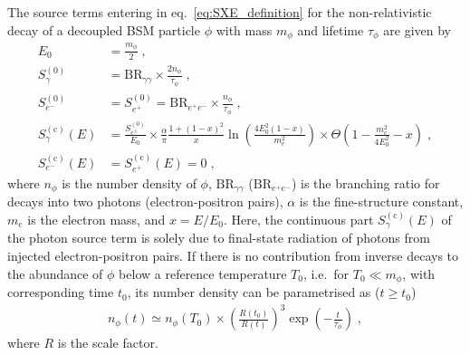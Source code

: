 \documentclass[11pt,a4paper]{article}
\newcommand{\eqsp}{\;}
\begin{document}
The source terms entering in eq.~\eqref{eq:SXE_definition} for the non-relativistic decay of a decoupled BSM particle $\phi$ with mass $m_\phi$ and lifetime $\tau_\phi$ are given by~\cite{Hufnagel:2018bjp,Forestell:2018txr,Mardon:2009rc,Birkedal:2005ep}
\begin{align}
E_0 &= \frac{m_\phi}{2}\eqsp, \\
S_\gamma^{(0)} &= \text{BR}_{\gamma \gamma} \times \frac{2 n_\phi}{\tau_\phi}\eqsp,\label{eq:sa_decay} \\
S_{e^-}^{(0)} &= S_{e^+}^{(0)} = \text{BR}_{e^+ e^-} \times \frac{n_\phi}{\tau_\phi}\eqsp,\label{eq:se_decay} \\
S_\gamma^{(\text{c})} (E) &= \frac{S^{(0)}_{e^\pm}}{E_0} \times \frac{\alpha}{\pi} \frac{1 + (1-x)^2}{x} \ln \left( \frac{4 E_0^2 (1-x)}{m_e^2} \right) \times \Theta \left( 1 - \frac{m_e^2}{4 E_0^2} - x \right)\eqsp, \label{eq:safsr_decay}\\
S_{e^-}^{(\text{c})} (E) &= S_{e^+}^{(\text{c})} (E) = 0\eqsp,
\end{align}
where $n_\phi$ is the number density of $\phi$, $\text{BR}_{\gamma \gamma}$ ($\text{BR}_{e^+ e^-}$) is the branching ratio for decays into two photons (electron-positron pairs), $\alpha$ is the fine-structure constant, $m_e$ is the electron mass, and $x = E/E_0$. Here, the continuous part $S_\gamma^{(\text{c})} (E)$ of the photon source term is solely due to final-state radiation of photons from injected electron-positron pairs.  If there is no contribution from inverse decays to the abundance of $\phi$ below a reference temperature $T_0$, i.e.\ for $T_0 \ll m_\phi$, with corresponding time $t_0$, its number density can be parametrised as ($t \geq t_0$)
\begin{align}
n_\phi (t) \simeq n_\phi (T_0) \times \left( \frac{R(t_0)}{R(t)} \right)^3 \exp \left( - \frac{t}{\tau_\phi} \right)\eqsp,
\label{eq:n_decay}
\end{align}
where $R$ is the scale factor.
\end{document}
